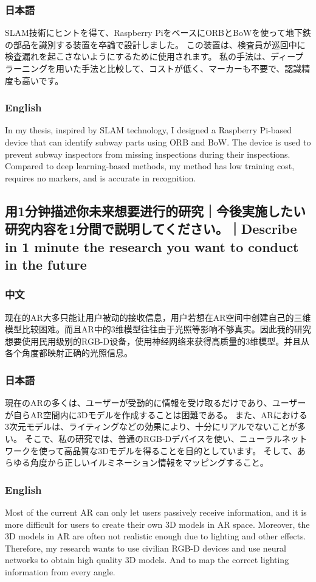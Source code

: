 \documentclass[lang=cn,11pt,a4paper]{elegantpaper}
\begin{document}
\subsubsection{日本語}
SLAM技術にヒントを得て、Raspberry PiをベースにORBとBoWを使って地下鉄の部品を識別する装置を卒論で設計しました。 この装置は、検査員が巡回中に検査漏れを起こさないようにするために使用されます。 私の手法は、ディープラーニングを用いた手法と比較して、コストが低く、マーカーも不要で、認識精度も高いです。
\subsubsection{English}
In my thesis, inspired by SLAM technology, I designed a Raspberry Pi-based device that can identify subway parts using ORB and BoW. The device is used to prevent subway inspectors from missing inspections during their inspections. Compared to deep learning-based methods, my method has low training cost, requires no markers, and is accurate in recognition.

\subsection{用1分钟描述你未来想要进行的研究｜今後実施したい研究内容を1分間で説明してください。｜Describe in 1 minute the research you want to conduct in the future}
\subsubsection{中文}
现在的AR大多只能让用户被动的接收信息，用户若想在AR空间中创建自己的三维模型比较困难。而且AR中的3维模型往往由于光照等影响不够真实。因此我的研究想要使用民用级别的RGB-D设备，使用神经网络来获得高质量的3维模型。并且从各个角度都映射正确的光照信息。
\subsubsection{日本語}
現在のARの多くは、ユーザーが受動的に情報を受け取るだけであり、ユーザーが自らAR空間内に3Dモデルを作成することは困難である。 また、ARにおける3次元モデルは、ライティングなどの効果により、十分にリアルでないことが多い。 そこで、私の研究では、普通のRGB-Dデバイスを使い、ニューラルネットワークを使って高品質な3Dモデルを得ることを目的としています。 そして、あらゆる角度から正しいイルミネーション情報をマッピングすること。
\subsubsection{English}
Most of the current AR can only let users passively receive information, and it is more difficult for users to create their own 3D models in AR space. Moreover, the 3D models in AR are often not realistic enough due to lighting and other effects. Therefore, my research wants to use civilian  RGB-D devices and use neural networks to obtain high quality 3D models. And to map the correct lighting information from every angle.
\end{document}
